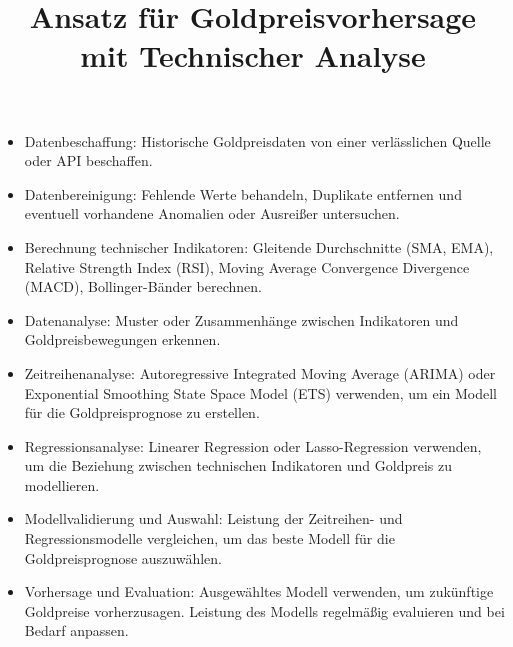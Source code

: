 \documentclass{article}
\title{Ansatz für Goldpreisvorhersage mit Technischer Analyse}
\author{}
\date{}
\begin{document}
\maketitle


\begin{itemize}[noitemsep]
    \item Datenbeschaffung: Historische Goldpreisdaten von einer verlässlichen Quelle oder API beschaffen.
    \item Datenbereinigung: Fehlende Werte behandeln, Duplikate entfernen und eventuell vorhandene Anomalien oder Ausreißer untersuchen.
    \item Berechnung technischer Indikatoren: Gleitende Durchschnitte (SMA, EMA), Relative Strength Index (RSI), Moving Average Convergence Divergence (MACD), Bollinger-Bänder berechnen.
    \item Datenanalyse: Muster oder Zusammenhänge zwischen Indikatoren und Goldpreisbewegungen erkennen.
    \item Zeitreihenanalyse: Autoregressive Integrated Moving Average (ARIMA) oder Exponential Smoothing State Space Model (ETS) verwenden, um ein Modell für die Goldpreisprognose zu erstellen.
    \item Regressionsanalyse: Linearer Regression oder Lasso-Regression verwenden, um die Beziehung zwischen technischen Indikatoren und Goldpreis zu modellieren.
    \item Modellvalidierung und Auswahl: Leistung der Zeitreihen- und Regressionsmodelle vergleichen, um das beste Modell für die Goldpreisprognose auszuwählen.
    \item Vorhersage und Evaluation: Ausgewähltes Modell verwenden, um zukünftige Goldpreise vorherzusagen. Leistung des Modells regelmäßig evaluieren und bei Bedarf anpassen.
\end{itemize}
\end{document}
